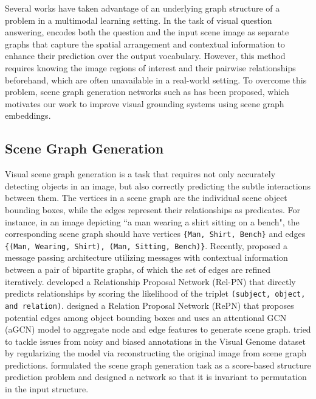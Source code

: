 Several works have taken advantage of an underlying graph structure of a problem in a multimodal learning setting. In the task of visual question answering, \cite{teney2017graph} encodes both the question and the input scene image as separate graphs that capture the spatial arrangement and contextual information to enhance their prediction over the output vocabulary. However, this method requires knowing the image regions of interest and their pairwise relationships beforehand, which are often unavailable in a real-world setting. To overcome this problem, scene graph generation networks such as \cite{yang2018graph} has been proposed, which motivates our work to improve visual grounding systems using scene graph embeddings. 

\subsection{Scene Graph Generation}

Visual scene graph generation is a task that requires not only accurately detecting objects in an image, but also correctly predicting the subtle interactions between them. The vertices in a scene graph are the individual scene object bounding boxes, while the edges represent their relationships as predicates. For instance, in an image depicting ``a man wearing a shirt sitting on a bench", the corresponding scene graph should have vertices \texttt{\{Man, Shirt, Bench\}} and edges \texttt{\{(Man, Wearing, Shirt), (Man, Sitting, Bench)\}}. Recently, \cite{xu2017scene} proposed a message passing architecture utilizing messages with contextual information between a pair of bipartite graphs, of which the set of edges are refined iteratively. \cite{zhang2017relationship} developed a Relationship Proposal Network (Rel-PN) that directly predicts relationships by scoring the likelihood of the triplet \texttt{(subject, object, and relation)}. \cite{yang2018graph} designed a Relation Proposal Network (RePN) that proposes potential edges among object bounding boxes and uses an attentional GCN (aGCN) model to aggregate node and edge features to generate scene graph.  \cite{gu2019scene} tried to tackle issues from noisy and biased annotations in the Visual Genome dataset \cite{krishna2017visual} by regularizing the model via reconstructing the original image from scene graph predictions. \cite{NIPS2018_7951} formulated the scene graph generation task as a score-based structure prediction problem and designed a network so that it is invariant to permutation in the input structure. 
